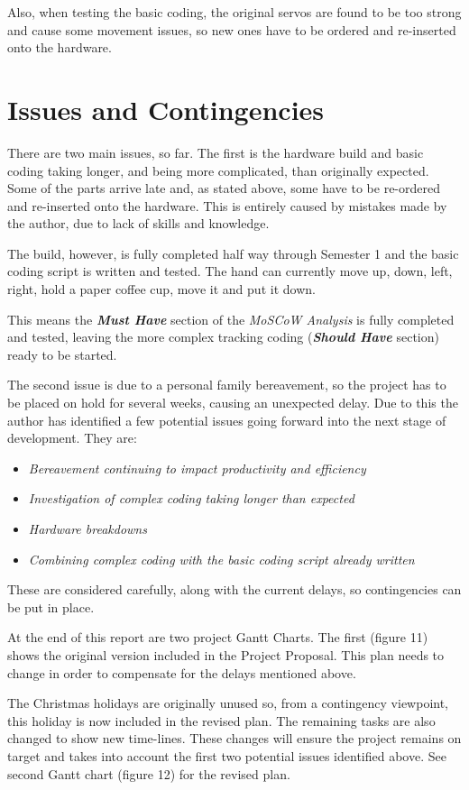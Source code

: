 \documentclass[progress]{cmpreport}
\begin{document}
{{{{{{Also, when testing the basic coding, the original servos are found to be too strong and cause some movement issues, so new ones have to be ordered and re-inserted onto the hardware. 

\section{Issues and Contingencies}
There are two main issues, so far. The first is the hardware build and basic coding taking longer, and being more complicated, than originally expected. Some of the parts arrive late and, as stated above, some have to be re-ordered and re-inserted onto the hardware. This is entirely caused by mistakes made by the author, due to lack of skills and knowledge. 

The build, however, is fully completed half way through Semester 1 and the basic coding script is written and tested. The hand can currently move up, down, left, right, hold a paper coffee cup, move it and put it down. 

This means the \textbf{\textit{Must Have}} section of the \textit{MoSCoW Analysis} is fully completed and tested, leaving the more complex tracking coding (\textbf{\textit{Should Have}} section) ready to be started. 

The second issue is due to a personal family bereavement, so the project has to be placed on hold for several weeks, causing an unexpected delay. Due to this the author has identified a few potential issues going forward into the next stage of development. They are:
\begin{itemize}		
	\item \textit{Bereavement continuing to impact productivity and efficiency}
	\item \textit{Investigation of complex coding taking longer than expected}
	\item \textit{Hardware breakdowns}
	\item \textit{Combining complex coding with the basic coding script already written}
\end{itemize}
These are considered carefully, along with the current delays, so contingencies can be put in place. 

At the end of this report are two project Gantt Charts. The first (figure 11) shows the original version included in the Project Proposal. This plan needs to change in order to compensate for the delays mentioned above. 

The Christmas holidays are originally unused so, from a contingency viewpoint, this holiday is now included in the revised plan. The remaining tasks are also changed to show new time-lines. These changes will ensure the project remains on target and takes into account the first two potential issues identified above. See second Gantt chart (figure 12) for the revised plan. 

}}}}}}
\end{document}
